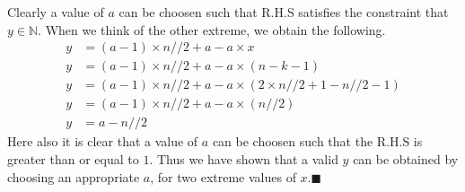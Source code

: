 \documentclass[10pt, twoside]{article}
\begin{document}
Clearly a value of $a$ can be choosen such that R.H.S satisfies the constraint that $y \in \mathbb{N}$. When we think of the other extreme, we obtain the following.
\begin{align*}
	y &= (a-1)\times n//2 + a - a\times x \\
	y &= (a-1)\times n//2 + a - a\times (n-k-1) \\
	y &= (a-1)\times n//2 + a - a\times (2\times n//2 + 1-n//2-1) \\
	y &= (a-1)\times n//2 + a - a\times (n//2) \\
	y &= a - n//2
\end{align*}
Here also it is clear that a value of \textbf{$a$} can be choosen such that the R.H.S is greater than or equal to $1$. \newline
Thus we have shown that a valid $y$ can be obtained by choosing an appropriate $a$, for two extreme values of $x$.$\blacksquare$
\end{document}
